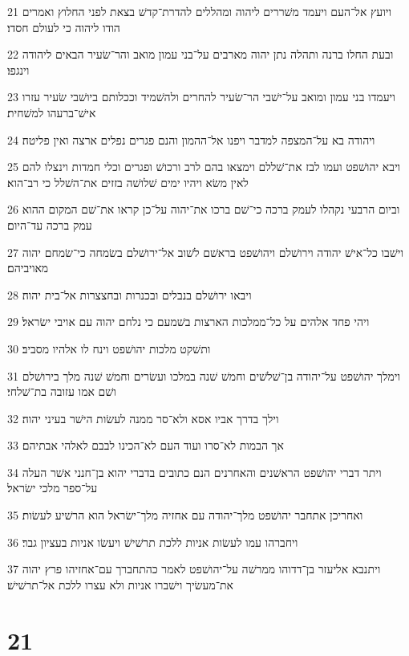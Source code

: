 \par 21 ויועץ אל־העם ויעמד משׁררים ליהוה ומהללים להדרת־קדשׁ בצאת לפני החלוץ ואמרים הודו ליהוה כי לעולם חסדו׃
\par 22 ובעת החלו ברנה ותהלה נתן יהוה מארבים על־בני עמון מואב והר־שׂעיר הבאים ליהודה וינגפו׃
\par 23 ויעמדו בני עמון ומואב על־ישׁבי הר־שׂעיר להחרים ולהשׁמיד וככלותם ביושׁבי שׂעיר עזרו אישׁ־ברעהו למשׁחית׃
\par 24 ויהודה בא על־המצפה למדבר ויפנו אל־ההמון והנם פגרים נפלים ארצה ואין פליטה׃
\par 25 ויבא יהושׁפט ועמו לבז את־שׁללם וימצאו בהם לרב ורכושׁ ופגרים וכלי חמדות וינצלו להם לאין משׂא ויהיו ימים שׁלושׁה בזזים את־השׁלל כי רב־הוא׃
\par 26 וביום הרבעי נקהלו לעמק ברכה כי־שׁם ברכו את־יהוה על־כן קראו את־שׁם המקום ההוא עמק ברכה עד־היום׃
\par 27 וישׁבו כל־אישׁ יהודה וירושׁלם ויהושׁפט בראשׁם לשׁוב אל־ירושׁלם בשׂמחה כי־שׂמחם יהוה מאויביהם׃
\par 28 ויבאו ירושׁלם בנבלים ובכנרות ובחצצרות אל־בית יהוה׃
\par 29 ויהי פחד אלהים על כל־ממלכות הארצות בשׁמעם כי נלחם יהוה עם אויבי ישׂראל׃
\par 30 ותשׁקט מלכות יהושׁפט וינח לו אלהיו מסביב׃
\par 31 וימלך יהושׁפט על־יהודה בן־שׁלשׁים וחמשׁ שׁנה במלכו ועשׂרים וחמשׁ שׁנה מלך בירושׁלם ושׁם אמו עזובה בת־שׁלחי׃
\par 32 וילך בדרך אביו אסא ולא־סר ממנה לעשׂות הישׁר בעיני יהוה׃
\par 33 אך הבמות לא־סרו ועוד העם לא־הכינו לבבם לאלהי אבתיהם׃
\par 34 ויתר דברי יהושׁפט הראשׁנים והאחרנים הנם כתובים בדברי יהוא בן־חנני אשׁר העלה על־ספר מלכי ישׂראל׃
\par 35 ואחריכן אתחבר יהושׁפט מלך־יהודה עם אחזיה מלך־ישׂראל הוא הרשׁיע לעשׂות׃
\par 36 ויחברהו עמו לעשׂות אניות ללכת תרשׁישׁ ויעשׂו אניות בעציון גבר׃
\par 37 ויתנבא אליעזר בן־דדוהו ממרשׁה על־יהושׁפט לאמר כהתחברך עם־אחזיהו פרץ יהוה את־מעשׂיך וישׁברו אניות ולא עצרו ללכת אל־תרשׁישׁ׃

\chapter{21}

